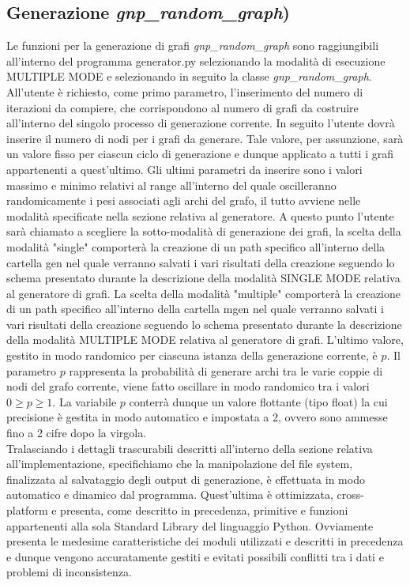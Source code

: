 \subsection{Generazione \textit{gnp\_random\_graph})}
\justify
Le funzioni per la generazione di grafi \textit{gnp\_random\_graph} sono raggiungibili all'interno del programma generator.py selezionando la modalità di esecuzione MULTIPLE MODE e selezionando in seguito la classe \textit{gnp\_random\_graph}. All'utente è richiesto, come primo parametro, l'inserimento del numero di iterazioni da compiere, che corrispondono al numero di grafi da costruire all'interno del singolo processo di generazione corrente. In seguito l'utente dovrà inserire il numero di nodi per i grafi da generare. Tale valore, per assunzione, sarà un valore fisso per ciascun ciclo di generazione e dunque applicato a tutti i grafi appartenenti a quest'ultimo. Gli ultimi parametri da inserire sono i valori massimo e minimo relativi al range all'interno del quale oscilleranno randomicamente i pesi associati agli archi del grafo, il tutto avviene nelle modalità specificate nella sezione relativa al generatore. A questo punto l'utente sarà chiamato a scegliere la sotto-modalità di generazione dei grafi, la scelta della modalità "single" comporterà la creazione di un path specifico all'interno della cartella gen nel quale verranno salvati i vari risultati della creazione seguendo lo schema presentato durante la descrizione della modalità SINGLE MODE relativa al generatore di grafi. La scelta della modalità "multiple" comporterà la creazione di un path specifico all'interno della cartella mgen nel quale verranno salvati i vari risultati della creazione seguendo lo schema presentato durante la descrizione della modalità MULTIPLE MODE relativa al generatore di grafi. L'ultimo valore, gestito in modo randomico per ciascuna istanza della generazione corrente, è $p$. Il parametro $p$ rappresenta la probabilità di generare archi tra le varie coppie di nodi del grafo corrente, viene fatto oscillare in modo randomico tra i valori \(0 \geq p \geq 1\). La variabile $p$ conterrà dunque un valore flottante (tipo float) la cui precisione è gestita in modo automatico e impostata a 2, ovvero sono ammesse fino a 2 cifre dopo la virgola.\\
Tralasciando i dettagli trascurabili descritti all'interno della sezione relativa all'implementazione, specifichiamo che la manipolazione del file system, finalizzata al salvataggio degli output di generazione, è effettuata in modo automatico e dinamico dal programma. Quest'ultima è ottimizzata, cross-platform e presenta, come descritto in precedenza, primitive e funzioni appartenenti alla sola Standard Library del linguaggio Python. Ovviamente presenta le medesime caratteristiche dei moduli utilizzati e descritti in precedenza e dunque vengono accuratamente gestiti e evitati possibili conflitti tra i dati e problemi di inconsistenza.\\

